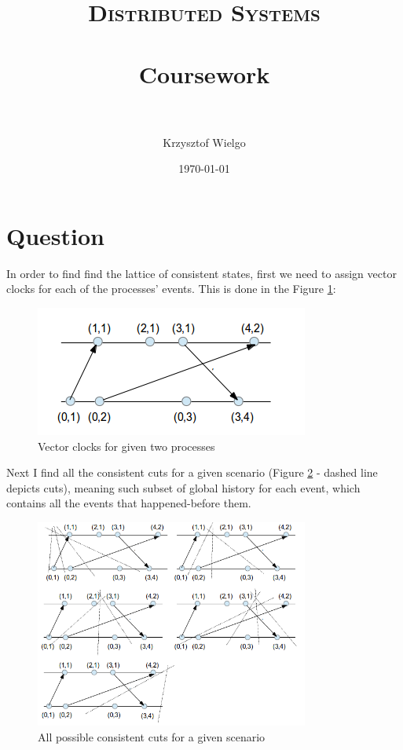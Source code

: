 \documentclass[paper=a4, fontsize=11pt]{scrartcl} %
\title{	
\normalfont \normalsize 
\textsc{Distributed Systems} \\ [5pt] %
\horrule{0.5pt} \\[0.2cm] %
\huge Coursework \\ %
\horrule{2pt} \\[0.2cm] %
}
\author{Krzysztof Wielgo} %
\date{\normalsize\today} %
\numberwithin{equation}{section} %
\numberwithin{figure}{section} %
\numberwithin{table}{section} %
\begin{document}
\lstset{language=bash}

\maketitle %


\section{Question}
In order to find find the lattice of consistent states, first we need to assign vector clocks for each of the processes' events. This is done in the Figure \ref{q1_1}:
\begin{figure}[ht!]
\centering
\includegraphics[width=90mm]{q1_1.png}
\caption{Vector clocks for given two processes}
\label{q1_1}
\end{figure}

Next I find all the consistent cuts for a given scenario (Figure \ref{q1_2} - dashed line depicts cuts), meaning such subset of global history for each event, which contains all the events that happened-before them.
\begin{figure}[ht!]
\centering
\includegraphics[width=90mm]{q1_2.png}
\caption{All possible consistent cuts for a given scenario}
\label{q1_2}
\end{figure}
\end{document}
